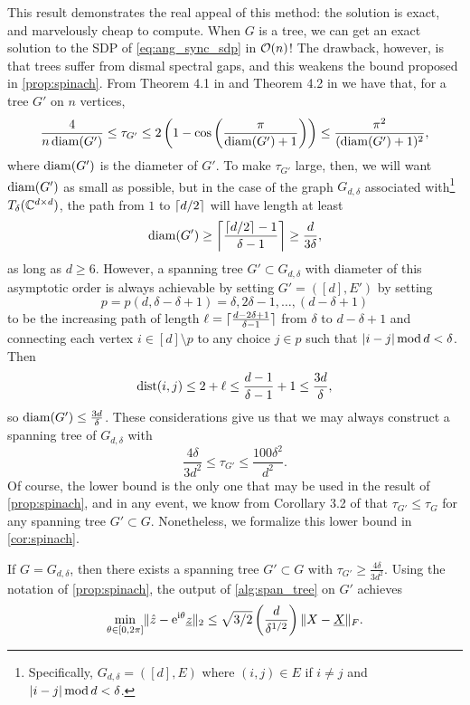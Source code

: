 This result demonstrates the real appeal of this method: the solution is exact, and marvelously cheap to compute.  When $G$ is a tree, we can get an exact solution to the SDP of \eqref{eq:ang_sync_sdp} in $\bigO(n)$!  The drawback, however, is that trees suffer from dismal spectral gaps, and this weakens the bound proposed in \cref{prop:spinach}.  From Theorem 4.1 in \cite{deabreu2006algebraicconnectivity} and Theorem 4.2 in \cite{mohar1991diameter} we have that, for a tree $G'$ on $n$ vertices, \[\dfrac{4}{n \diam(G')} \le \tau_{G'} \le 2 \left(1 - \cos\left(\dfrac{\pi}{\diam(G') + 1}\right)\right) \le \dfrac{\pi^2}{(\diam(G') + 1)^2},\] where $\diam(G')$ is the diameter of $G'$.  To make $\tau_{G'}$ large, then, we will want $\diam(G')$ as small as possible, but in the case of the graph $G_{d, \delta}$ associated with\footnote{Specifically, $G_{d, \delta} = ([d], E)$ where $(i, j) \in E$ if $i \neq j$ and $\abs{i - j} \mod d < \delta$.} $T_\delta(\Cdxd)$, the path from $1$ to $\ceil{d/2}$ will have length at least \[\diam(G') \ge \ceil*{\frac{\ceil{d/2} - 1}{\delta - 1}} \ge \dfrac{d}{3 \delta},\] as long as $d \ge 6$.  However, a spanning tree $G' \subset G_{d, \delta}$ with diameter of this asymptotic order is always achievable by setting $G' = ([d], E')$ by setting \[p = p(d, \delta - \delta + 1) = \delta, 2 \delta - 1, \ldots, (d - \delta + 1)\] to be the increasing path of length $\ell = \ceil{\frac{d - 2 \delta + 1}{\delta- 1}}$ from $\delta$ to $d - \delta + 1$ and connecting each vertex $i \in [d] \setminus p$ to any choice $j \in p$ such that $\abs{i - j} \mod d < \delta$.  Then \[\dist(i, j) \le 2 + \ell \le \dfrac{d - 1}{\delta - 1} + 1 \le \frac{3d}{\delta},\] so $\diam(G') \le \frac{3d}{\delta}$.  These considerations give us that we may always construct a spanning tree of $G_{d, \delta}$ with \[\dfrac{4 \delta}{3 d^2} \le \tau_{G'} \le \dfrac{100 \delta^2}{d^2}.\]  Of course, the lower bound is the only one that may be used in the result of \cref{prop:spinach}, and in any event, we know from Corollary 3.2 of \cite{fiedler1973algebraic_connectivity} that $\tau_{G'} \le \tau_G$ for any spanning tree $G' \subset G$.  Nonetheless, we formalize this lower bound in \cref{cor:spinach}.

\begin{corollary}\label{cor:spinach}
  If $G = G_{d, \delta}$, then there exists a spanning tree $G' \subset G$ with $\tau_{G'} \ge \frac{4 \delta}{3 d^2}$.  Using the notation of \cref{prop:spinach}, the output of \cref{alg:span_tree} on $G'$ achieves \begin{equation*} \mintheta \norm{\hz - \eit \uz}_2 \le \sqrt{3/2} \left(\frac{d}{\delta^{1/2}}\right) \norm{X - \uX}_F. \end{equation*}
\end{corollary}


